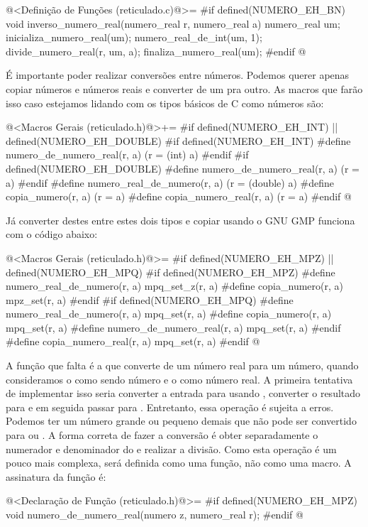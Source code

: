 \iniciocodigo
@<Definição de Funções (reticulado.c)@>=
#if defined(NUMERO_EH_BN)
void inverso_numero_real(numero_real r, numero_real a){
  numero_real um;
  inicializa_numero_real(um);
  numero_real_de_int(um, 1);
  divide_numero_real(r, um, a);
  finaliza_numero_real(um);
}
#endif
@
\fimcodigo

É importante poder realizar conversões entre números. Podemos querer
apenas copiar números e números reais e converter de um pra outro. As
macros que farão isso caso estejamos lidando com os tipos básicos de C
como números são:

\iniciocodigo
@<Macros Gerais (reticulado.h)@>+=
#if defined(NUMERO_EH_INT) || defined(NUMERO_EH_DOUBLE)
#if defined(NUMERO_EH_INT)
#define numero_de_numero_real(r, a) (r = (int) a)
#endif
#if defined(NUMERO_EH_DOUBLE)
#define numero_de_numero_real(r, a) (r = a)
#endif
#define numero_real_de_numero(r, a) (r = (double) a)
#define copia_numero(r, a) (r = a)
#define copia_numero_real(r, a) (r = a)
#endif
@
\fimcodigo

Já converter destes entre estes dois tipos e copiar usando o GNU GMP
funciona com o código abaixo:

\iniciocodigo
@<Macros Gerais (reticulado.h)@>=
#if defined(NUMERO_EH_MPZ) || defined(NUMERO_EH_MPQ)
#if defined(NUMERO_EH_MPZ)
#define numero_real_de_numero(r, a) mpq_set_z(r, a)
#define copia_numero(r, a) mpz_set(r, a)
#endif
#if defined(NUMERO_EH_MPQ)
#define numero_real_de_numero(r, a) mpq_set(r, a)
#define copia_numero(r, a) mpq_set(r, a)
#define numero_de_numero_real(r, a) mpq_set(r, a)
#endif
#define copia_numero_real(r, a) mpq_set(r, a)
#endif
@
\fimcodigo

A função que falta é a que converte de um número real para um número,
quando consideramos o  como sendo número e
o  como número real. A primeira tentativa de
implementar isso seria converter a entrada para 
usando , converter o resultado
para  e em seguida passar
para . Entretanto, essa operação é sujeita a
erros. Podemos ter um número grande ou pequeno demais que não pode ser
convertido para  ou . A
forma correta de fazer a conversão é obter separadamente o numerador e
denominador do  e realizar a divisão. Como esta
operação é um pouco mais complexa, será definida como uma função, não
como uma macro. A assinatura da função é:

\iniciocodigo
@<Declaração de Função (reticulado.h)@>=
#if defined(NUMERO_EH_MPZ)
void numero_de_numero_real(numero z, numero_real r);
#endif
@
\fimcodigo

